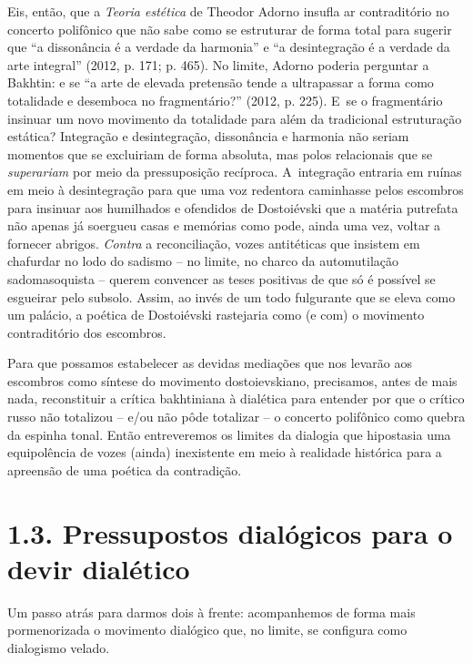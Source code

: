 {Eis, então, que a \emph{Teoria estética} de Theodor Adorno insufla ar
contraditório no concerto polifônico que não sabe como se estruturar de
forma total para sugerir que ``a dissonância é a verdade da harmonia'' e
``a desintegração é a verdade da arte integral'' (2012, p. 171; p. 465).
No limite, Adorno poderia perguntar a Bakhtin: e se ``a arte de elevada
pretensão tende a ultrapassar a forma como totalidade e desemboca no
fragmentário?'' (2012, p. 225). E~se o fragmentário insinuar um novo
movimento da totalidade para além da tradicional estruturação estática?
Integração e desintegração, dissonância e harmonia não seriam momentos
que se excluiriam de forma absoluta, mas polos relacionais que se
\emph{superariam} por meio da pressuposição recíproca. A~integração
entraria em ruínas em meio à desintegração para que uma voz redentora
caminhasse pelos escombros para insinuar aos humilhados e ofendidos de
Dostoiévski que a matéria putrefata não apenas já soergueu casas e
memórias como pode, ainda uma vez, voltar a fornecer abrigos.
\emph{Contra} a reconciliação, vozes antitéticas que insistem em
chafurdar no lodo do sadismo -- no limite, no charco da automutilação
sadomasoquista -- querem convencer as teses positivas de que só é
possível se esgueirar pelo subsolo. Assim, ao invés de um todo
fulgurante que se eleva como um palácio, a poética de Dostoiévski
rastejaria como (e com) o movimento contraditório dos escombros.

Para que possamos estabelecer as devidas mediações que nos levarão aos
escombros como síntese do movimento dostoievskiano, precisamos, antes de
mais nada, reconstituir a crítica bakhtiniana à dialética para entender
por que o crítico russo não totalizou -- e/ou não pôde totalizar -- o
concerto polifônico como quebra da espinha tonal. Então entreveremos os
limites da dialogia que hipostasia uma equipolência de vozes (ainda)
inexistente em meio à realidade histórica para a apreensão de uma
poética da contradição.

\section{1.3. Pressupostos dialógicos para o devir dialético}

Um passo atrás para darmos dois à frente: acompanhemos de forma mais
pormenorizada o movimento dialógico que, no limite, se configura como
dialogismo velado.

}
